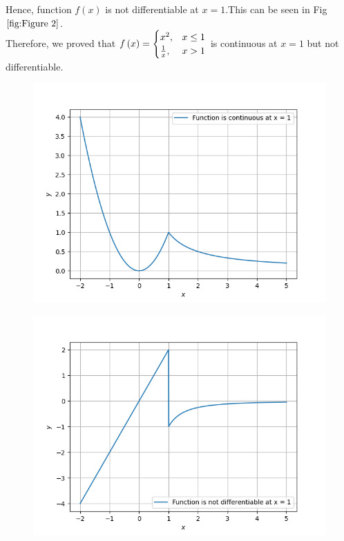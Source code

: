 \documentclass[journal,12pt,twocolumn]{IEEEtran}
\begin{document}
    Hence, function $f(x)$ is not differentiable at $ x = 1 $.This can be seen in Fig $\ref{fig:Figure 2}$.\\
    Therefore, we proved that  $ f\left(x\right) = \begin{cases}
                                         x^2, & x \leq 1 \\ 
                                        \frac{1}{x}, & x > 1
                                        \end{cases} $ is continuous at $ x = 1 $ but not differentiable. 
\begin{figure}[h!]
     \centering
     \includegraphics[width=\columnwidth]{Figs/Figure_1.png}
     \caption{}
     \label{fig:Figure 1}
\end{figure}
\begin{figure}[h!]
     \centering
     \includegraphics[width=\columnwidth]{Figs/Figure_2.png}
     \caption{}
     \label{fig:Figure 2}
\end{figure}
\end{document}
